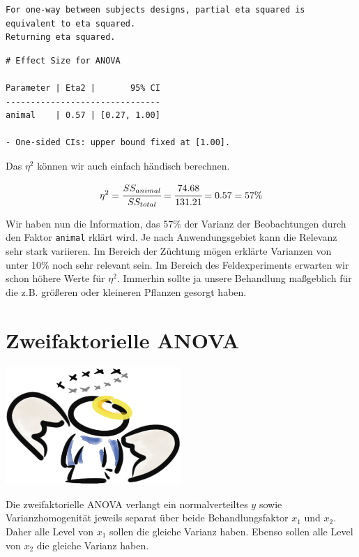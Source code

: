 \documentclass[
  letterpaper,
  DIV=11,
  oneside]{scrreport}
\begin{document}
\begin{verbatim}
For one-way between subjects designs, partial eta squared is equivalent to eta squared.
Returning eta squared.
\end{verbatim}

\begin{verbatim}
# Effect Size for ANOVA

Parameter | Eta2 |       95% CI
-------------------------------
animal    | 0.57 | [0.27, 1.00]

- One-sided CIs: upper bound fixed at [1.00].
\end{verbatim}

Das \(\eta^2\) können wir auch einfach händisch berechnen.

\[
\eta^2 = \cfrac{SS_{animal}}{SS_{total}} = \cfrac{74.68}{131.21} = 0.57 = 57\%
\]

Wir haben nun die Information, das 57\% der Varianz der Beobachtungen
durch den Faktor \texttt{animal} rklärt wird. Je nach Anwendungsgebiet
kann die Relevanz sehr stark variieren. Im Bereich der Züchtung mögen
erklärte Varianzen von unter 10\% noch sehr relevant sein. Im Bereich
des Feldexperiments erwarten wir schon höhere Werte für \(\eta^2\).
Immerhin sollte ja unsere Behandlung maßgeblich für die z.B. größeren
oder kleineren Pflanzen gesorgt haben.

\hypertarget{sec-fac2}{%
\section{Zweifaktorielle ANOVA}\label{sec-fac2}}

\begin{marginfigure}

{\centering \includegraphics[width=0.5\textwidth,height=\textheight]{./images/angel_01.png}

}

\end{marginfigure}

Die zweifaktorielle ANOVA verlangt ein normalverteiltes \(y\) sowie
Varianzhomogenität jeweils separat über beide Behandlungsfaktor \(x_1\)
und \(x_2\). Daher alle Level von \(x_1\) sollen die gleiche Varianz
haben. Ebenso sollen alle Level von \(x_2\) die gleiche Varianz haben.
\end{document}
